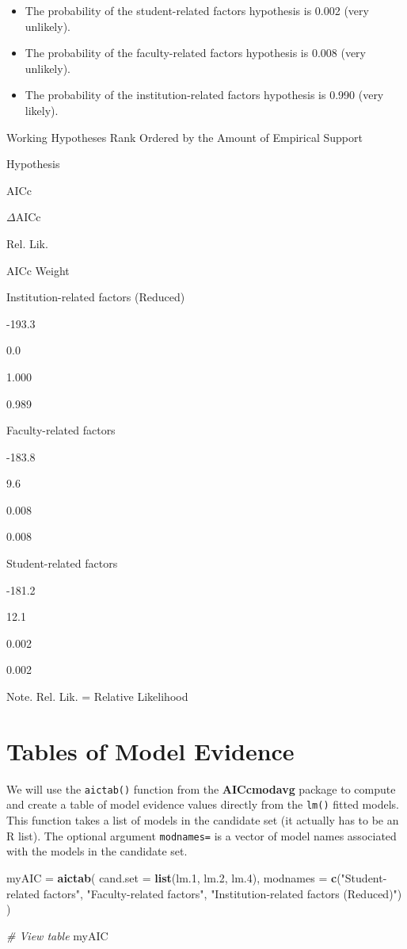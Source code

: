 \documentclass[]{book}
\newenvironment{Shaded}{\begin{snugshade}}{\end{snugshade}}
\newcommand{\CommentTok}[1]{\textcolor[rgb]{0.56,0.35,0.01}{\textit{#1}}}
\newcommand{\DataTypeTok}[1]{\textcolor[rgb]{0.13,0.29,0.53}{#1}}
\newcommand{\FloatTok}[1]{\textcolor[rgb]{0.00,0.00,0.81}{#1}}
\newcommand{\KeywordTok}[1]{\textcolor[rgb]{0.13,0.29,0.53}{\textbf{#1}}}
\newcommand{\NormalTok}[1]{#1}
\newcommand{\StringTok}[1]{\textcolor[rgb]{0.31,0.60,0.02}{#1}}
\providecommand{\tightlist}{%
  \setlength{\itemsep}{0pt}\setlength{\parskip}{0pt}}
\begin{document}
\begin{itemize}
\tightlist
\item
  The probability of the student-related factors hypothesis is 0.002 (very unlikely).
\item
  The probability of the faculty-related factors hypothesis is 0.008 (very unlikely).
\item
  The probability of the institution-related factors hypothesis is 0.990 (very likely).
\end{itemize}

\label{tab:unnamed-chunk-188}Working Hypotheses Rank Ordered by the Amount of Empirical Support

Hypothesis

AICc

\(\Delta\)AICc

Rel. Lik.

AICc Weight

Institution-related factors (Reduced)

-193.3

0.0

1.000

0.989

Faculty-related factors

-183.8

9.6

0.008

0.008

Student-related factors

-181.2

12.1

0.002

0.002

{Note.} Rel. Lik. = Relative Likelihood

\hypertarget{tables-of-model-evidence}{%
\section{Tables of Model Evidence}\label{tables-of-model-evidence}}

We will use the \texttt{aictab()} function from the \textbf{AICcmodavg} package to compute and create a table of model evidence values directly from the \texttt{lm()} fitted models. This function takes a list of models in the candidate set (it actually has to be an R list). The optional argument \texttt{modnames=} is a vector of model names associated with the models in the candidate set.

\begin{Shaded}
\begin{Highlighting}[]
\NormalTok{myAIC =}\StringTok{ }\KeywordTok{aictab}\NormalTok{(}
  \DataTypeTok{cand.set =} \KeywordTok{list}\NormalTok{(lm}\FloatTok{.1}\NormalTok{, lm}\FloatTok{.2}\NormalTok{, lm}\FloatTok{.4}\NormalTok{),}
  \DataTypeTok{modnames =} \KeywordTok{c}\NormalTok{(}\StringTok{"Student-related factors"}\NormalTok{, }\StringTok{"Faculty-related factors"}\NormalTok{, }\StringTok{"Institution-related factors (Reduced)"}\NormalTok{)}
\NormalTok{  )}

\CommentTok{# View table}
\NormalTok{myAIC}
\end{Highlighting}
\end{Shaded}
\end{document}
